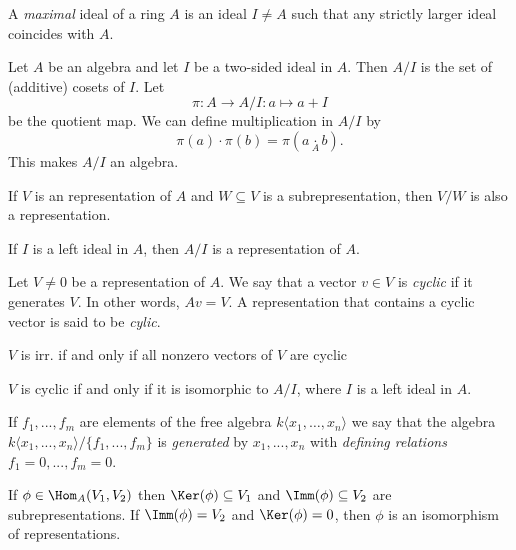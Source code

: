 \begin{defn}
A \emph{maximal} ideal of a ring \(A\) is an ideal \(I\neq A\) such that any strictly larger ideal coincides with \(A\).
\end{defn}

\begin{defn}
Let \(A\) be an algebra and let \(I\) be a two-sided ideal in \(A\). Then \(A/I\) is the set of (additive) cosets of \(I\). Let 
$$\pi :A \rightarrow A/I : a \mapsto  a+I$$
be the quotient map. We can define multiplication in \(A/I\) by 
$$\pi (a)\cdot \pi (b)= \pi (a\underset{A}{\cdot }b).$$
This makes \(A/I\) an algebra.
\end{defn}

\begin{thm}
If \(V\) is an representation of \(A\) and \(W\subseteq V\) is a subrepresentation, then \(V/W\) is also a representation.
\end{thm}

\begin{thm}
If $I$ is a left ideal in \(A\), then $A/I$ is a representation of $A$.
\end{thm}

\begin{defn}
Let $V\neq 0$ be a representation of $A$. We say that a vector $v\in V$ is \emph{cyclic} if it generates $V$. In other words, $Av=V$. A representation that contains a cyclic vector is said to be \emph{cylic}.
\end{defn}

\begin{thm}
$V$ is irr. if and only if all nonzero vectors of $V$ are cyclic
\end{thm}

\begin{thm}
$V$ is cyclic if and only if it is isomorphic to $A/I$, where $I$ is a left ideal in $A$.
\end{thm}

\begin{defn}
If $f_{1},...,f_{m}$ are elements of the free algebra $k\langle x_{1},\ldots ,x_{n}\rangle $ we say that the algebra $k\langle x_{1},...,x_{n}\rangle /\{f_{1},...,f_{m}\}$ is \emph{generated} by $x_{1},...,x_{n}$ with \emph{defining relations} $f_{1}=0,...,f_{m}=0$.
\end{defn}

\begin{thm}
If \(\phi \in \Hom_A(V_{1},V_{2})\) then \(\Ker(\phi )\subseteq V_{1}\) and \(\Imm(\phi )\subseteq V_{2}\) are subrepresentations. If \(\Imm(\phi )=V_{2}\) and \(\Ker(\phi )=0\), then \(\phi \) is an isomorphism of representations. 
\end{thm}

